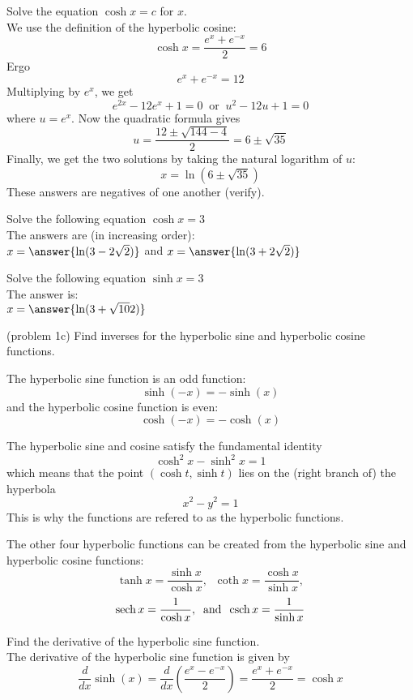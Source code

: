 \documentclass[handout]{ximera}
\begin{document}
\begin{example}[example 1]
Solve the equation $\cosh x = c$ for $x$.\\
We use the definition of the hyperbolic cosine:
\[
\cosh x = \frac{e^x + e^{-x}}{2} = 6
\]
Ergo
\[
e^x +e^{-x} = 12
\]
Multiplying by $e^x$, we get
\[
e^{2x} - 12e^x +1 = 0 \;\; \mbox{or} \;\; u^2 - 12u + 1 = 0
\]
where $u = e^x$.  Now the quadratic formula gives
\[
u = \frac{12 \pm \sqrt{144 - 4}}{2} = 6 \pm \sqrt{35}
\]
Finally, we get the two solutions by taking the natural logarithm of $u$:
\[
x = \ln\left(6 \pm \sqrt{35}\right)
\]
These answers are negatives of one another (verify).
\end{example}

\begin{problem}[problem 1a]
Solve the following equation $\cosh x = 3$\\
The answers are (in increasing order):\\
$x = \answer{\ln(3-2\sqrt 2)}$ and $x = \answer{\ln(3+2\sqrt 2)}$
\end{problem}


\begin{problem}[problem 1b]
Solve the following equation $\sinh x = 3$\\
The answer is:\\
$x = \answer{\ln(3+\sqrt{10} 2)}$
\end{problem}

\begin{problem}(problem 1c) 
Find inverses for the hyperbolic sine and hyperbolic cosine functions.
\end{problem}

The hyperbolic sine function is an odd function:
\[
\sinh(-x) = -\sinh(x)
\]
and the hyperbolic cosine function is even:
\[
\cosh(-x) = -\cosh(x)
\]

The hyperbolic sine and cosine satisfy the fundamental identity
\[
\cosh^2 x - \sinh^2 x =1
\]
which means that the point $(\cosh t, \sinh t)$ lies on the (right branch of) the hyperbola
\[
x^2 -y^2 = 1
\]
This is why the functions are refered to as the hyperbolic functions.

The other four hyperbolic functions can be created from the hyperbolic sine and hyperbolic cosine functions:
\[
\tanh x = \frac{\sinh x}{\cosh x},\;\; \coth x = \frac{\cosh x}{\sinh x},
\]
\[
\operatorname{sech} x = \frac{1}{\cosh x}, \;\; \mbox{and}\;\; \operatorname{csch} x = \frac{1}{\sinh x}
\]

\begin{example}[example 2]
Find the derivative of the hyperbolic sine function.\\
The derivative of the hyperbolic sine function is given by
\[
\frac{d}{dx} \sinh(x) = \frac{d}{dx} \left( \frac{e^x -e^{-x}}{2} \right) = \frac{e^x + e^{-x}}{2} = \cosh x
\]
\end{example}
\end{document}
